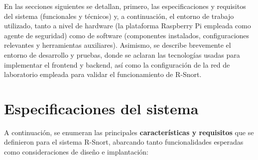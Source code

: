 \documentclass[11pt,a4paper,twoside]{report}
\begin{document}
En las secciones siguientes se detallan, primero, las especificaciones y requisitos del sistema (funcionales y técnicos) y, a continuación, el entorno de trabajo utilizado, tanto a nivel de hardware (la plataforma Raspberry Pi empleada como agente de seguridad) como de software (componentes instalados, configuraciones relevantes y herramientas auxiliares). Asimismo, se describe brevemente el entorno de desarrollo y pruebas, donde se aclaran las tecnologías usadas para implementar el frontend y backend, así como la configuración de la red de laboratorio empleada para validar el funcionamiento de R-Snort.\newline

\section{Especificaciones del sistema}
A continuación, se enumeran las principales \textbf{características y requisitos} que se definieron para el sistema R-Snort, abarcando tanto funcionalidades esperadas como consideraciones de diseño e implantación:\newline
\end{document}
